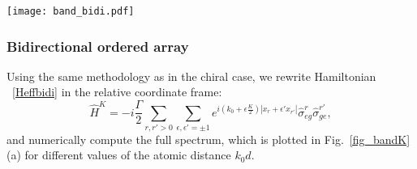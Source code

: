 \documentclass[pra,twocolumn,showpacs,preprintnumbers,amsmath,amssymb]{revtex4-1}
\begin{document}
\begin{figure*}[!t]
\texttt{[image: band\_bidi.pdf]}%
\caption{(a) Spectrum $E_K$ of two-excitation eigenstates of a bi-directional waveguide, as obtained from Eq.~\eqref{HK_bidi}, as a function of the center of mass momentum $K$ and for different values of the lattice constant $k_0 d$. The blue dots indicate continuum states, whose boundaries are denoted by the black curves. The solid red curves indicate the bound state dispersion relation, while the red dots indicate the special values $Kd=0$ and $Kd=\pm\pi$ where the bound-state properties can be computed analytically. The red dashed lines indicate the values of $K=\pm2k_0$ where the bound state dispersion branch emerges from the continuum. The horizontal dashed black lines in the first two panels correspond to twice the frequency of the input field used in Fig.~\ref{fig:pulse_bidi}. (b) Population distribution of the most localized state as a function of the dimensionless relative coordinate $r=x_r/d$, for different values of total momentum $Kd$ and lattice constant $k_0 d$. These numerical calculations were performed for $N=150$.}
\label{fig_bandK}
\end{figure*}




\subsubsection{Bidirectional ordered array}


Using the same methodology as in the chiral case, we rewrite Hamiltonian ~\eqref{Heffbidi}  in the relative coordinate frame:
\begin{equation}\label{HK_bidi}
\hat H^K=-i\frac{\Gamma}{2}\sum_{r,r'>0}\sum_{\epsilon,\epsilon'=\pm1}e^{i(k_0+\epsilon\frac{K}{2})|x_r+\epsilon'x_{r'}|}\hat\sigma^{r}_{eg}\hat\sigma^{r'}_{ge},
\end{equation}
and numerically compute the full spectrum, which is plotted in Fig.~\ref{fig_bandK}(a) for different values of the atomic distance $k_0d$. 
\end{document}
